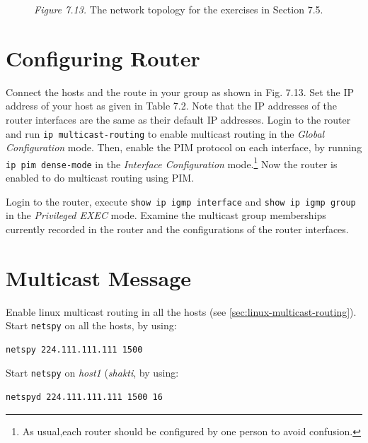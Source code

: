 \documentclass{../UTNetLab}
\begin{document}
    \begin{figure}[H]
        \centering
        \caption{\textit{Figure 7.13.} The network topology for the exercises in Section 7.5.}
        \label{fig:7.13}
    \end{figure}

\section{Configuring Router}
\label{sec:config-router}
    Connect the hosts and the route in your group as shown in Fig. 7.13. Set the IP address of your host as given in Table 7.2. Note that the IP addresses of the router interfaces are the same as their default IP addresses.
    Login to the router and run \lstinline{ip multicast-routing} to enable multicast routing in the \textit{Global Configuration} mode.
    Then, enable the PIM protocol on each interface, by running \lstinline{ip pim dense-mode} in the \textit{Interface Configuration} mode.\footnote{As usual,each router should be configured by one person to avoid confusion.} Now the router is enabled to do multicast routing using PIM.

    Login to the router, execute \lstinline{show ip igmp interface} and \lstinline{show ip igmp group} in the \textit{Privileged EXEC} mode.
    Examine the multicast group memberships currently recorded in the router and the configurations of the router interfaces.

\section{Multicast Message}
    Enable linux multicast routing in all the hosts (see \autoref{sec:linux-multicast-routing}).\\
    Start \lstinline{netspy} on all the hosts, by using:
    \begin{lstlisting}
netspy 224.111.111.111 1500
    \end{lstlisting}
    Start \lstinline{netspy} on \textit{host1} (\textit{shakti}, by using:
    \begin{lstlisting}
netspyd 224.111.111.111 1500 16
    \end{lstlisting}
    
\end{document}
